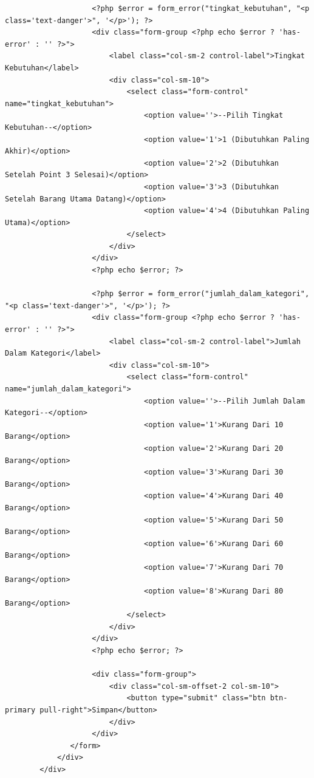 \begin{enumerate}
\begin{enumerate}
\begin{lstlisting}
                    <?php $error = form_error("tingkat_kebutuhan", "<p class='text-danger'>", '</p>'); ?>
                    <div class="form-group <?php echo $error ? 'has-error' : '' ?>">
                        <label class="col-sm-2 control-label">Tingkat Kebutuhan</label>
                        <div class="col-sm-10">
                            <select class="form-control" name="tingkat_kebutuhan">
                                <option value=''>--Pilih Tingkat Kebutuhan--</option>
                                <option value='1'>1 (Dibutuhkan Paling Akhir)</option>
                                <option value='2'>2 (Dibutuhkan Setelah Point 3 Selesai)</option>
                                <option value='3'>3 (Dibutuhkan Setelah Barang Utama Datang)</option>
                                <option value='4'>4 (Dibutuhkan Paling Utama)</option>
                            </select>
                        </div>
                    </div>
                    <?php echo $error; ?>

                    <?php $error = form_error("jumlah_dalam_kategori", "<p class='text-danger'>", '</p>'); ?>
                    <div class="form-group <?php echo $error ? 'has-error' : '' ?>">
                        <label class="col-sm-2 control-label">Jumlah Dalam Kategori</label>
                        <div class="col-sm-10">
                            <select class="form-control" name="jumlah_dalam_kategori">
                                <option value=''>--Pilih Jumlah Dalam Kategori--</option>
                                <option value='1'>Kurang Dari 10 Barang</option>
                                <option value='2'>Kurang Dari 20 Barang</option>
                                <option value='3'>Kurang Dari 30 Barang</option>
                                <option value='4'>Kurang Dari 40 Barang</option>
                                <option value='5'>Kurang Dari 50 Barang</option>
                                <option value='6'>Kurang Dari 60 Barang</option>
                                <option value='7'>Kurang Dari 70 Barang</option>
                                <option value='8'>Kurang Dari 80 Barang</option>
                            </select>
                        </div>
                    </div>
                    <?php echo $error; ?>

                    <div class="form-group">
                        <div class="col-sm-offset-2 col-sm-10">
                            <button type="submit" class="btn btn-primary pull-right">Simpan</button>
                        </div>
                    </div>
               </form>
            </div>
        </div>
        

\end{lstlisting}
\end{enumerate}
\end{enumerate}
